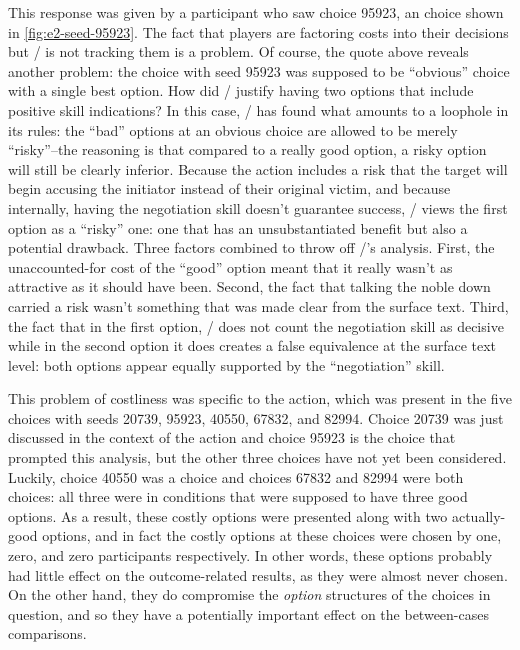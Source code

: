 This response was given by a participant who saw choice 95923, an \obvf{} choice shown in \cref{fig:e2-seed-95923}.
%
The fact that players are factoring costs into their decisions but \dunyazad/ is not tracking them is a problem.
%
Of course, the quote above reveals another problem: the choice with seed 95923 was supposed to be ``obvious'' choice with a single best option.
%
How did \dunyazad/ justify having two options that include positive skill indications?
%
In this case, \dunyazad/ has found what amounts to a loophole in its rules: the ``bad'' options at an obvious choice are allowed to be merely ``risky''--the reasoning is that compared to a really good option, a risky option will still be clearly inferior.
%
Because the  action includes a risk that the target will begin accusing the initiator instead of their original victim, and because internally, having the negotiation skill doesn't guarantee success, \dunyazad/ views the first option as a ``risky'' one: one that has an unsubstantiated benefit but also a potential drawback.
%
Three factors combined to throw off \dunyazad/'s analysis.
%
First, the unaccounted-for cost of the ``good'' option meant that it really wasn't as attractive as it should have been.
%
Second, the fact that talking the noble down carried a risk wasn't something that was made clear from the surface text.
%
Third, the fact that in the first option, \dunyazad/ does not count the negotiation skill as decisive while in the second option it does creates a false equivalence at the surface text level: both options appear equally supported by the ``negotiation'' skill.


This problem of costliness was specific to the  action, which was present in the five choices with seeds 20739, 95923, 40550, 67832, and 82994.
%
Choice 20739 was just discussed in the context of the  action and choice 95923 is the choice that prompted this analysis, but the other three choices have not yet been considered.
%
Luckily, choice 40550 was a \unxf{} choice and choices 67832 and 82994 were both \exps{} choices: all three were in conditions that were supposed to have three good options.
%
As a result, these costly options were presented along with two actually-good options, and in fact the costly options at these choices were chosen by one, zero, and zero participants respectively.
%
In other words, these options probably had little effect on the outcome-related results, as they were almost never chosen.
%
On the other hand, they do compromise the \emph{option} structures of the choices in question, and so they have a potentially important effect on the between-cases comparisons.


